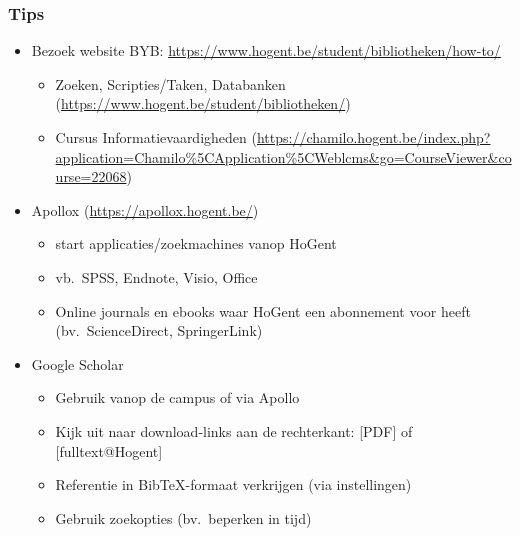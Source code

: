 \documentclass[aspectratio=169]{beamer}
\begin{document}
\begin{frame}
  \frametitle{Tips}

  \begin{itemize}
    \item<+-> Bezoek website BYB: \url{https://www.hogent.be/student/bibliotheken/how-to/}
      \begin{itemize}
        \item Zoeken, Scripties/Taken, Databanken (\url{https://www.hogent.be/student/bibliotheken/})
        \item Cursus Informatievaardigheden (\url{https://chamilo.hogent.be/index.php?application=Chamilo\%5CApplication\%5CWeblcms&go=CourseViewer&course=22068})
      \end{itemize}
    \item<+-> Apollox (\url{https://apollox.hogent.be/})
      \begin{itemize}
        \item start applicaties/zoekmachines vanop HoGent
        \item vb.~SPSS, Endnote, Visio, Office
        \item Online journals en ebooks waar HoGent een abonnement voor heeft (bv.~ScienceDirect, SpringerLink)
      \end{itemize}
    \item<+-> Google Scholar
      \begin{itemize}
        \item Gebruik vanop de campus of via Apollo
        \item Kijk uit naar download-links aan de rechterkant: [PDF] of [fulltext@Hogent]
        \item Referentie in Bib{\TeX}-formaat verkrijgen (via instellingen)
        \item Gebruik zoekopties (bv.~beperken in tijd)
      \end{itemize}
  \end{itemize}
\end{frame}
\end{document}
